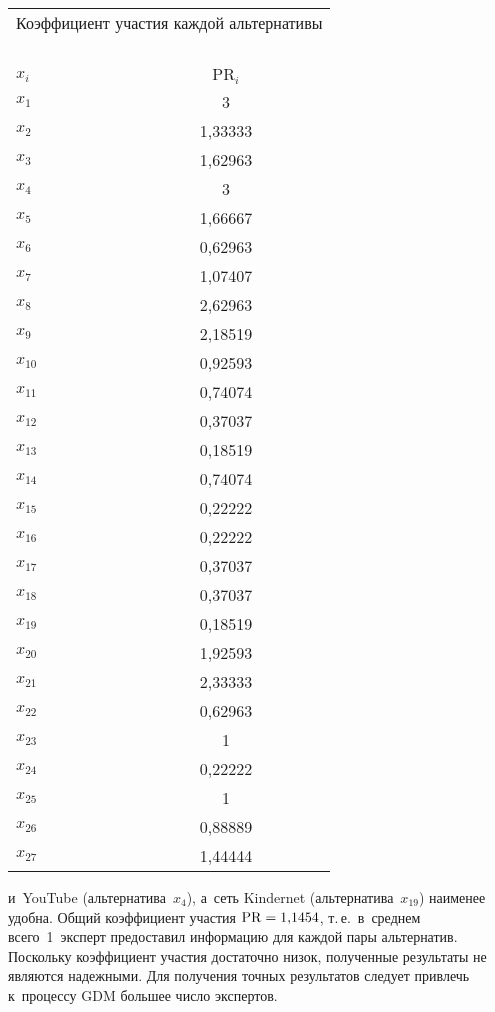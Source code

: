 \begin{multicols}{2}
{\small
  \begin{center}
  \tabcolsep=7pt
  \begin{tabular}{|l|c|}
  \multicolumn{2}{p{32mm}}{Коэффициент учас\-тия каждой альтернативы}\\
  \multicolumn{2}{c}{\ }\\[-6pt]
  \hline
$x_i$&$\mathrm{PR}_i$\\
\hline
$x_1$&3\hphantom{,99999}\\
$x_2$&1,33333\\
$x_3$&1,62963\\
$x_4$&3\hphantom{,99999}\\
$x_5$&1,66667\\
$x_6$&0,62963\\
$x_7$&1,07407\\
$x_8$&2,62963\\
$x_9$&2,18519\\
$x_{10}$&0,92593\\
$x_{11}$&0,74074\\
$x_{12}$&0,37037\\
$x_{13}$&0,18519\\
$x_{14}$&0,74074\\
$x_{15}$&0,22222\\
$x_{16}$&0,22222\\
$x_{17}$&0,37037\\
$x_{18}$&0,37037\\
$x_{19}$&0,18519\\
$x_{20}$&1,92593\\
$x_{21}$&2,33333\\
$x_{22}$&0,62963\\
$x_{23}$&1\hphantom{,99999}\\
$x_{24}$&0,22222\\
$x_{25}$&1\hphantom{,99999}\\
$x_{26}$&0,88889\\
$x_{27}$&1,44444\\
  \hline
  \end{tabular}
  \end{center}
  }

\vspace*{9pt}

\noindent
 и~YouTube (альтернатива~$x_4$), а~сеть Kindernet 
(альтернатива~$x_{19}$) наименее удобна. Общий коэффициент участия 
$\mathrm{PR}\hm=1{,}1454$, т.\,е.\ в~среднем всего~1~эксперт предоставил информацию 
для каждой пары альтернатив. Поскольку коэффициент участия достаточно 
низок, полученные результаты не являются надежными. Для получения точных 
результатов следует привлечь к~процессу GDM большее число экспертов.


\end{multicols}
